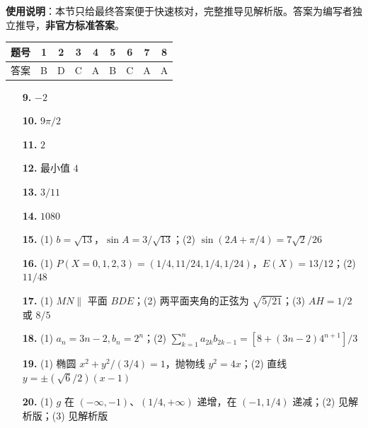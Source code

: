 
\begin{gknotice}
\textbf{使用说明}：本节只给最终答案便于快速核对，完整推导见解析版。答案为编写者独立推导，\textbf{非官方标准答案}。
\end{gknotice}

\begin{center}\begin{tabular}{ccccccccc}
\toprule
题号 & 1 & 2 & 3 & 4 & 5 & 6 & 7 & 8 \\
\midrule
答案 & B & D & C & A & B & C & A & A \\
\bottomrule
\end{tabular}\end{center}

\begin{itemize}[leftmargin=2.6em]
  \item[\textbf{9.}] $-2$
  \item[\textbf{10.}] $9\pi/2$
  \item[\textbf{11.}] $2$
  \item[\textbf{12.}] 最小值 $4$
  \item[\textbf{13.}] $3/11$
  \item[\textbf{14.}] $1080$
\end{itemize}

\begin{itemize}[leftmargin=2.6em]
  \item[\textbf{15.}] (1) $b=\sqrt{13}$，$\sin A=3/\sqrt{13}$；(2) $\sin(2A+\pi/4)=7\sqrt2/26$
  \item[\textbf{16.}] (1) $P(X=0,1,2,3)=(1/4,11/24,1/4,1/24)$，$E(X)=13/12$；(2) $11/48$
  \item[\textbf{17.}] (1) $MN\parallel$ 平面 $BDE$；(2) 两平面夹角的正弦为 $\sqrt{5/21}$；(3) $AH=1/2$ 或 $8/5$
  \item[\textbf{18.}] (1) $a_n=3n-2,b_n=2^n$；(2) $\sum_{k=1}^n a_{2k}b_{2k-1}=[8+(3n-2)4^{n+1}]/3$
  \item[\textbf{19.}] (1) 椭圆 $x^2+y^2/(3/4)=1$，抛物线 $y^2=4x$；(2) 直线 $y=\pm(\sqrt6/2)(x-1)$
  \item[\textbf{20.}] (1) $g$ 在 $(-\infty,-1)$、$(1/4,+\infty)$ 递增，在 $(-1,1/4)$ 递减；(2) 见解析版；(3) 见解析版
\end{itemize}
